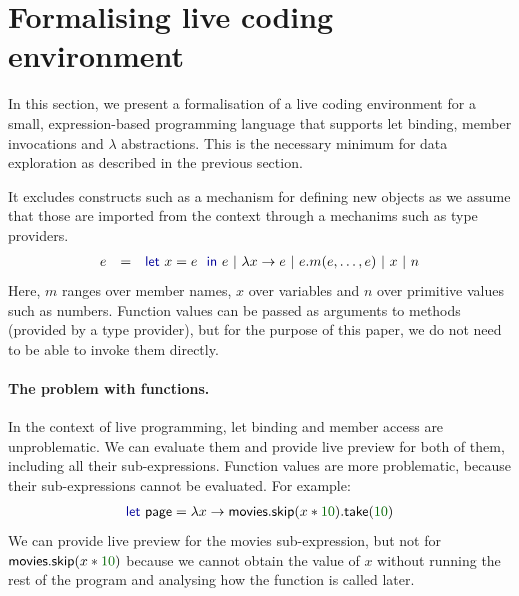 \documentclass[sigplan,10pt]{acmart}\settopmatter{printfolios=true,printccs=false,printacmref=false}
\newcommand{\num}[1]{\textcolor{numclr}{#1}}
\newcommand{\ident}[1]{\textnormal{\sffamily #1}}
\newcommand{\kvd}[1]{\textnormal{\textcolor{kvdclr}{\sffamily #1}}}
\begin{document}

\newpage


\section{Formalising live coding environment}
\label{sec:formal}

In this section, we present a formalisation of a live coding environment for a small,
expression-based programming language that supports \kvd{let} binding, member invocations
and $\lambda$ abstractions. This is the necessary minimum for data exploration as described
in the previous section.  

It excludes constructs such as a mechanism for defining new objects as we assume that those
are imported from the context through a mechanims such as type providers.
%
\begin{equation*}
\begin{array}{lcl}
e &=& \kvd{let}~x = e~\kvd{in}~e ~|~ \lambda x\rightarrow e ~|~ e.m(e, \ldots, e) ~|~ x ~|~ n
\end{array}
\end{equation*}
%
Here, $m$ ranges over member names, $x$ over variables and $n$ over primitive values such as 
numbers. Function values can be passed as arguments to methods (provided by a type provider), but 
for the purpose of this paper, we do not need to be able to invoke them directly.

\paragraph{The problem with functions.}
In the context of live programming, \kvd{let} binding and member access are unproblematic.
We can evaluate them and provide live preview for both of them, including all their sub-expressions.
Function values are more problematic, because their sub-expressions cannot be evaluated. For example:
%
\begin{equation*}
\begin{array}{l}
\kvd{let}~\ident{page} = \lambda x \rightarrow \ident{movies}.\ident{skip}(x*\num{10}).\ident{take}(\num{10})
\end{array}
\end{equation*}
%
We can provide live preview for the \ident{movies} sub-expression, but not for 
$\ident{movies}.\ident{skip}(x*\num{10})$ because we cannot obtain the value of $x$ without
running the rest of the program and analysing how the function is called later.
\end{document}
